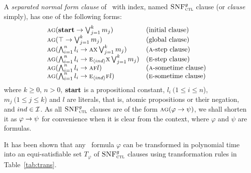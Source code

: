 \documentclass[twoside,11pt]{article}
\begin{document}
A {\em separated normal form clause} of \CTL\ with index, named ${\textsc{SNF}_{\textsc{ctl}}^g}$ clause (or {\em clause} simply), has one of the following forms:
\[
\begin{array}{ll}
	\textsc{a} \textsc{g} (\textbf{start} \rightarrow \bigvee_{j=1}^{k} m_{j}) & \text{(initial clause)} \\
	\textsc{a} \textsc{g} (\top\rightarrow \bigvee_{j=1}^{k} m_{j}) &\text{(global clause)} \\
	\textsc{a} \textsc{g} (\bigwedge_{i=1}^{n} l_{i} \rightarrow \textsc{a} \textsc{x} \bigvee_{j=1}^{k} m_{j}) & (\textsc{a}\text{-step clause}) \\
	\textsc{a} \textsc{g} (\bigwedge_{i=1}^{n} l_{i} \rightarrow \textsc{e}_{\langle{ind}\rangle} \textsc{x} \bigvee_{j=1}^{k} m_{j}) & (\textsc{e}\text{-step clause}) \\
	\textsc{a} \textsc{g} (\bigwedge_{i=1}^{n} l_{i} \rightarrow \textsc{a} \textsc{f} l) & (\textsc{a}\text{-sometime clause}) \\
	\textsc{a} \textsc{g} (\bigwedge_{i=1}^{n} l_{i} \rightarrow \textsc{e}_{{\langle{ind}\rangle}} \textsc{f} l) & (\textsc{e}\text{-sometime clause})\\
\end{array}
\]
where $k \ge 0$, $n > 0$, $\textbf{start}$ is a propositional constant, $l_i~(1 \le i \le n$), $m_j~(1 \le j \le k$) and $l$ are literals, that is, atomic propositions or their negation, and $ind\in {\cal I}$. %
As all ${\textsc{SNF}_{\textsc{ctl}}^g}$ clauses are of the form $\textsc{a} \textsc{g}(\varphi \rightarrow \psi)$, we shall
shorten it as $\varphi \rightarrow \psi$ for convenience when it is clear from the context, where $\varphi$ and $\psi$ are formulas.


It has been shown that any \CTL\ formula  $\varphi$ can be transformed in polynomial time into
an equi-satisfiable set $T_\varphi$ of ${\textsc{SNF}_{\textsc{ctl}}^g}$ clauses using transformation rules in Table~\ref{tab:trans}.
\end{document}

